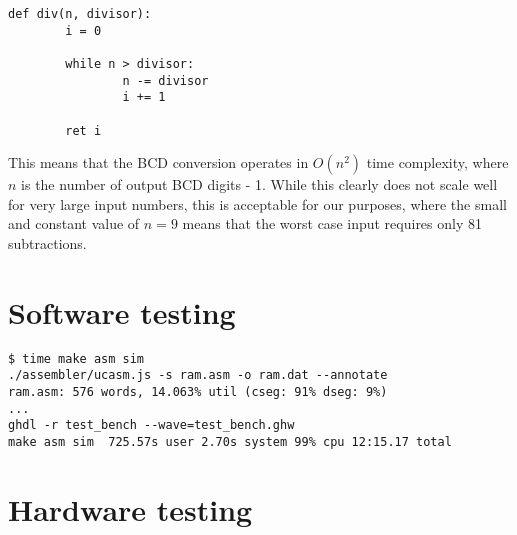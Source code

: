 \documentclass[12pt,a4paper]{article}
\begin{document}
\begin{verbatim}
def div(n, divisor):
        i = 0

        while n > divisor:
                n -= divisor
                i += 1

        ret i
\end{verbatim}

This means that the BCD conversion operates in $O(n^2)$ time
complexity, where $n$ is the number of output BCD digits - 1. While
this clearly does not scale well for very large input numbers, this is
acceptable for our purposes, where the small and constant value of $n
= 9$ means that the worst case input requires only 81 subtractions.

\section{Software testing}

\begin{verbatim}
$ time make asm sim
./assembler/ucasm.js -s ram.asm -o ram.dat --annotate
ram.asm: 576 words, 14.063% util (cseg: 91% dseg: 9%)
...
ghdl -r test_bench --wave=test_bench.ghw
make asm sim  725.57s user 2.70s system 99% cpu 12:15.17 total
\end{verbatim}

\section{Hardware testing}
\end{document}
